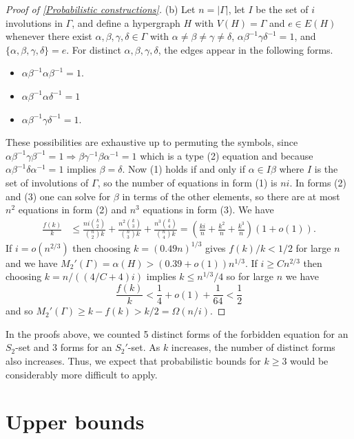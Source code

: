 \documentclass[12pt]{article}
\begin{document}
\begin{proof}[Proof of \autoref{Probabilistic constructions}]
(b) Let $n=|\Gamma|$, let $I$ be the set of $i$ involutions in $\Gamma$, and define a hypergraph $H$ with $V(H)=\Gamma$ and $e\in E(H)$ whenever there exist $\alpha,\beta,\gamma,\delta\in \Gamma$ with $\alpha\ne\beta\ne\gamma\ne\delta$, $\alpha\beta^{-1}\gamma\delta^{-1}=1$, and $\{\alpha,\beta,\gamma,\delta\}=e$. For distinct $\alpha,\beta,\gamma,\delta$, the edges appear in the following forms.
\begin{itemize}
    \item[(1)] $\alpha\beta^{-1}\alpha\beta^{-1}=1$.
    \item[(2)] $\alpha\beta^{-1}\alpha\delta^{-1}=1$
    \item[(3)] $\alpha\beta^{-1}\gamma\delta^{-1}=1.$
\end{itemize}
These possibilities are exhaustive up to permuting the symbols, since $\alpha\beta^{-1}\gamma\beta^{-1}=1\Longrightarrow\beta\gamma^{-1}\beta\alpha^{-1}=1$ which is a type (2) equation and because $\alpha\beta^{-1} \delta \alpha^{-1} = 1$ implies $\beta = \delta$. Now (1) holds if and only if $\alpha\in I\beta$ where $I$ is the set of involutions of $\Gamma$, so the number of equations in form (1) is $ni$. In forms (2) and (3) one can solve for $\beta$ in terms of the other elements, so there are at most $n^2$ equations in form (2) and $n^3$ equations in form (3). We have
$$\begin{aligned}
    \frac{f(k)}{k}&\le\frac{ni{k\choose 2}}{{n\choose 2}k}+\frac{n^2{k\choose 3}}{{n\choose 3}k}+\frac{n^3{k\choose 4}}{{n\choose 4}k}=\left(\frac{ki}{n}+\frac{k^2}{n}+\frac{k^3}{n}\right)(1+o(1)).
\end{aligned}$$
If $i=o(n^{2/3})$ then choosing $k=(0.49n)^{1/3}$ gives $f(k)/k<1/2$ for large $n$ and we have $M_2'(\Gamma)=\alpha(H)>(0.39+o(1))n^{1/3}$. If $i\ge Cn^{2/3}$ then choosing $k=n/((4/C+4)i)$ implies $k\le n^{1/3}/4$ so for large $n$ we have
$$\frac{f(k)}{k}<\frac{1}{4}+o(1)+\frac{1}{64}<\frac{1}{2}$$
and so $M_2'(\Gamma)\ge k-f(k)>k/2=\Omega(n/i).$
\end{proof}

In the proofs above, we counted 5 distinct forms of the forbidden equation for an $S_2$-set and 3 forms for an $S_2'$-set. As $k$ increases, the number of distinct forms also increases. Thus, we expect that probabilistic bounds for $k\ge 3$ would be considerably more difficult to apply.

\section{Upper bounds} \label{Upper bound section}
\end{document}

